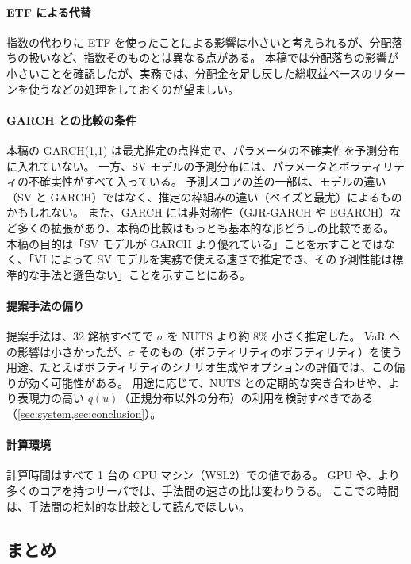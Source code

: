 \paragraph{ETF による代替}
指数の代わりに ETF を使ったことによる影響は小さいと考えられるが、分配落ちの扱いなど、指数そのものとは異なる点がある。
本稿では分配落ちの影響が小さいことを確認したが、実務では、分配金を足し戻した総収益ベースのリターンを使うなどの処理をしておくのが望ましい。

\paragraph{GARCH との比較の条件}
本稿の GARCH(1,1) は最尤推定の点推定で、パラメータの不確実性を予測分布に入れていない。
一方、SV モデルの予測分布には、パラメータとボラティリティの不確実性がすべて入っている。
予測スコアの差の一部は、モデルの違い（SV と GARCH）ではなく、推定の枠組みの違い（ベイズと最尤）によるものかもしれない。
また、GARCH には非対称性（GJR-GARCH や EGARCH）など多くの拡張があり、本稿の比較はもっとも基本的な形どうしの比較である。
本稿の目的は「SV モデルが GARCH より優れている」ことを示すことではなく、「VI によって SV モデルを実務で使える速さで推定でき、その予測性能は標準的な手法と遜色ない」ことを示すことにある。

\paragraph{提案手法の偏り}
提案手法は、32 銘柄すべてで $\sigma$ を NUTS より約 8\% 小さく推定した。
VaR への影響は小さかったが、$\sigma$ そのもの（ボラティリティのボラティリティ）を使う用途、たとえばボラティリティのシナリオ生成やオプションの評価では、この偏りが効く可能性がある。
用途に応じて、NUTS との定期的な突き合わせや、より表現力の高い $q(u)$（正規分布以外の分布）の利用を検討すべきである（\cref{sec:system,sec:conclusion}）。

\paragraph{計算環境}
計算時間はすべて 1 台の CPU マシン（WSL2）での値である。
GPU や、より多くのコアを持つサーバでは、手法間の速さの比は変わりうる。
ここでの時間は、手法間の相対的な比較として読んでほしい。

\subsection{まとめ}\label{sec:emp-summary}

